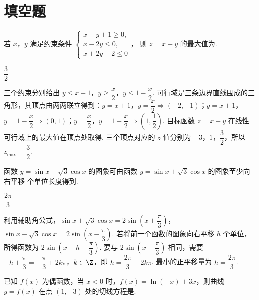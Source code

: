 \section{填空题}

\begin{problem}
若 \(x\)，\(y\) 满足约束条件
\(\begin{cases}
x-y+1\ge0,\\
x-2y\le0,\\
x+2y-2\le0
\end{cases}\)，
则 \(z=x+y\) 的最大值为\fillinblank{}.
\end{problem}

\begin{answer}
\(\dfrac{3}{2}\)
\end{answer}

\begin{solution}
三个约束分别给出 \(y\le x+1\)，\(y\ge\dfrac{x}{2}\)，\(y\le1-\dfrac{x}{2}\). 可行域是三条边界直线围成的三角形，其顶点由两两联立得到：\(y=x+1\)，\(y=\dfrac{x}{2}\Longrightarrow(-2,-1)\)；\(y=x+1\)，\(y=1-\dfrac{x}{2}\Longrightarrow(0,1)\)；\(y=\dfrac{x}{2}\)，\(y=1-\dfrac{x}{2}\Longrightarrow(1,\dfrac12)\). 目标函数 \(z=x+y\) 在线性可行域上的最大值在顶点处取得. 三个顶点对应的 \(z\) 值分别为 \(-3\)，\(1\)，\(\dfrac32\)，所以 \(z_{\max}=\dfrac32\).
\end{solution}

\begin{problem}
函数 \(y=\sin x-\sqrt3\cos x\) 的图象可由函数 \(y=\sin x+\sqrt3\cos x\) 的图象至少向右平移\fillinblank{} 个单位长度得到.
\end{problem}

\begin{answer}
\(\dfrac{2\pi}{3}\)
\end{answer}

\begin{solution}
利用辅助角公式，\(\sin x+\sqrt3\cos x=2\sin\left(x+\dfrac\pi3\right)\)，\(\sin x-\sqrt3\cos x=2\sin\left(x-\dfrac\pi3\right)\). 若将前一个函数的图象向右平移 \(h\) 个单位，所得函数为 \(2\sin\left(x-h+\dfrac\pi3\right)\). 要与 \(2\sin\left(x-\dfrac\pi3\right)\) 相同，需要 \(-h+\dfrac\pi3=-\dfrac\pi3+2k\pi\)，\(k\in\Z\)，即 \(h=\dfrac{2\pi}{3}-2k\pi\). 最小的正平移量为 \(h=\dfrac{2\pi}{3}\).
\end{solution}

\begin{problem}
已知 \(f(x)\) 为偶函数，当 \(x<0\) 时，\(f(x)=\ln(-x)+3x\)，则曲线 \(y=f(x)\) 在点 \((1,-3)\) 处的切线方程是\fillinblank{}.
\end{problem}

